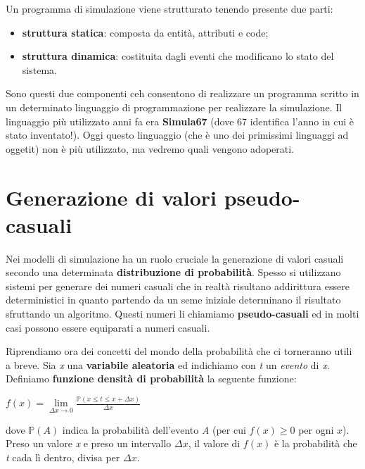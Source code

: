 \documentclass[11pt]{book}
\begin{document}
Un programma di simulazione viene strutturato tenendo presente due parti:

\begin{itemize}
\item {\bf struttura statica}: composta da entit\`a, attributi e code;

\item {\bf struttura dinamica}: costituita dagli eventi che modificano
  lo stato del sistema.
\end{itemize}

Sono questi due componenti ceh consentono di realizzare un programma
scritto in un determinato linguaggio di programmazione per realizzare
la simulazione. Il linguaggio pi\`u utilizzato anni fa era {\bf
  Simula67} (dove 67 identifica l'anno in cui \`e stato
inventato!). Oggi questo linguaggio (che \`e uno dei primissimi
linguaggi ad oggetit) non \`e pi\`u utilizzato, ma vedremo quali
vengono adoperati.

\section{Generazione di valori pseudo-casuali}

Nei modelli di simulazione ha un ruolo cruciale la generazione di
valori casuali secondo una determinata {\bf distribuzione di
  probabilit\`a}. Spesso si utilizzano sistemi per generare dei numeri
casuali che in realt\`a risultano addirittura essere deterministici in
quanto partendo da un seme iniziale determinano il risultato
sfruttando un algoritmo. Questi numeri li chiamiamo {\bf
  pseudo-casuali} ed in molti casi possono essere equiparati a numeri
casuali.

Riprendiamo ora dei concetti del mondo della probabilit\`a che ci
torneranno utili a breve. Sia {\em x} una {\bf variabile aleatoria} ed
indichiamo con {\em t} un {\em evento} di {\em x}. Definiamo {\bf
  funzione densit\`a di probabilit\`a} la seguente funzione:

\begin{center}
$f(x) = \lim\limits_{\Delta x \rightarrow 0} \frac{\mathbb{P}(x \leq t
    \leq x + \Delta x)}{\Delta x}$
\end{center}

dove $\mathbb{P}(A)$ indica la probabilit\`a dell'evento {\em A} (per
cui $f(x)\geq 0$ per ogni $x$). Preso un valore {\em x} e preso un
intervallo $\Delta x$, il valore di $f(x)$ \`e la probabilit\`a che
{\em t} cada l\`i dentro, divisa per $\Delta x$.
\end{document}
